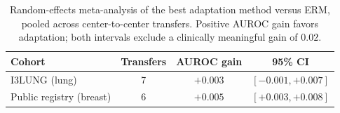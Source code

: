 \begin{table}[!t]
\caption{Random-effects meta-analysis of the best adaptation method versus ERM,
pooled across center-to-center transfers. Positive AUROC gain favors adaptation;
both intervals exclude a clinically meaningful gain of $0.02$.}
\label{tab:meta}
\centering
\footnotesize
\begin{tabular}{@{}lccc@{}}
\toprule
\textbf{Cohort} & \textbf{Transfers} & \textbf{AUROC gain} & \textbf{95\% CI} \\
\midrule
I3LUNG (lung)            & 7 & $+0.003$ & $[-0.001, +0.007]$ \\
Public registry (breast) & 6 & $+0.005$ & $[+0.003, +0.008]$ \\
\bottomrule
\end{tabular}
\end{table}


%


